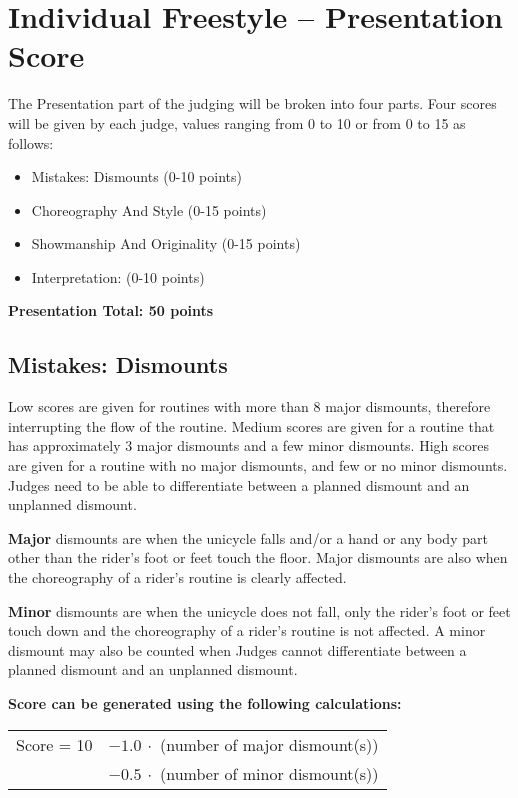 \section{Individual Freestyle – Presentation Score \label{sec:freestyle_individual-presentation-score}}
The Presentation part of the judging will be broken into four parts.
Four scores will be given by each judge, values ranging from 0 to 10 or from 0 to 15 as follows:
\begin{itemize}
\item Mistakes: Dismounts (0-10 points) 
\item Choreography And Style (0-15 points) 
\item Showmanship And Originality (0-15 points) 
\item Interpretation: (0-10 points)
\end{itemize}
\textbf{Presentation Total: 50 points}

\subsection{Mistakes: Dismounts}
Low scores are given for routines with more than 8 major dismounts, therefore interrupting the flow of the routine.
Medium scores are given for a routine that has approximately 3 major dismounts and a few minor dismounts.
High scores are given for a routine with no major dismounts, and few or no minor dismounts.
Judges need to be able to differentiate between a planned dismount and an unplanned dismount.

\textbf{Major} dismounts are when the unicycle falls and/or a hand or any body part other than the rider's foot or feet touch the floor.
Major dismounts are also when the choreography of a rider's routine is clearly affected.

\textbf{Minor} dismounts are when the unicycle does not fall, only the rider's foot or feet touch down and the choreography of a rider's routine is not affected.
A minor dismount may also be counted when Judges cannot differentiate between a planned dismount and an unplanned dismount.


\textbf{Score can be generated using the following calculations:}

\begin{tabular}{r l}
Score = 10 & $- 1.0\ \cdot$ (number of major dismount(s)) \\
 & $- 0.5\ \cdot$ (number of minor dismount(s)) \\
\end{tabular}


